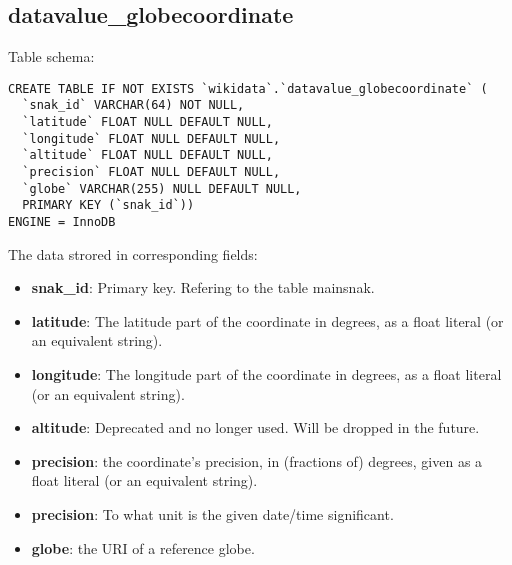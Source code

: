 \documentclass[12pt]{article}
\begin{document}
\subsection{datavalue\_globecoordinate}
\lstset{language=SQL}
Table schema:
\begin{lstlisting}
CREATE TABLE IF NOT EXISTS `wikidata`.`datavalue_globecoordinate` (
  `snak_id` VARCHAR(64) NOT NULL,
  `latitude` FLOAT NULL DEFAULT NULL,
  `longitude` FLOAT NULL DEFAULT NULL,
  `altitude` FLOAT NULL DEFAULT NULL,
  `precision` FLOAT NULL DEFAULT NULL,
  `globe` VARCHAR(255) NULL DEFAULT NULL,
  PRIMARY KEY (`snak_id`))
ENGINE = InnoDB
\end{lstlisting}
The data strored in corresponding fields:
\begin{itemize}
\item \textbf{snak\_id}: Primary key. Refering to the table mainsnak.
\item \textbf{latitude}: The latitude part of the coordinate in degrees, as a float literal (or an equivalent string).
\item \textbf{longitude}: The longitude part of the coordinate in degrees, as a float literal (or an equivalent string).
\item \textbf{altitude}: Deprecated and no longer used. Will be dropped in the future.
\item \textbf{precision}: the coordinate's precision, in (fractions of) degrees, given as a float literal (or an equivalent string).
\item \textbf{precision}: To what unit is the given date/time significant.
\item \textbf{globe}: the URI of a reference globe.
\end{itemize}
\end{document}
